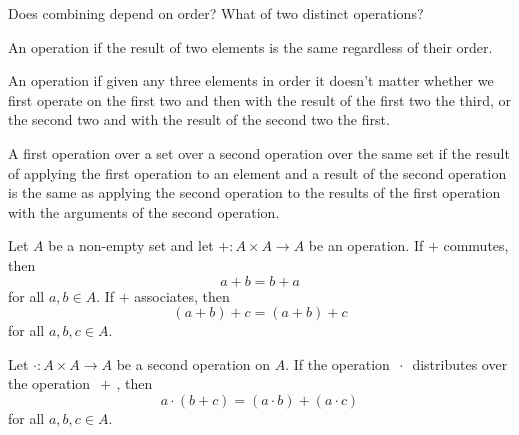 
\sbasic





\sstart
{}


Does combining depend on order?
What of two distinct operations?


An operation  if
the result of two elements is the same
regardless of their order.

An operation 
if given any three elements in order it
doesn't matter whether we first operate
on the first two and then with the result
of the first two the third, or the second
two and with the result of the second two
the first.

A first operation over a set
over a second operation over the same set
if the result of applying the first
operation to an element and a result of
the second operation is the same as
applying the second operation to the results
of the first operation with the arguments
of the second operation.


Let $A$ be a non-empty set and let $+: A \times A \to A$
be an operation.
If $+$ commutes, then
$$
  a + b = b + a
$$
for all $a, b \in A$.
If $+$ associates, then
$$
  (a + b) + c = (a + b) + c
$$
for all $a, b, c \in A$.

Let $\cdot: A \times A \to A$ be a second
operation on $A$.
If the operation $\,\cdot\,$ distributes over
the operation $\,+\,$,
then
$$
  a \cdot (b + c) =
  (a \cdot b) + (a \cdot c)
$$
for all $a, b, c \in A$.


\strats
